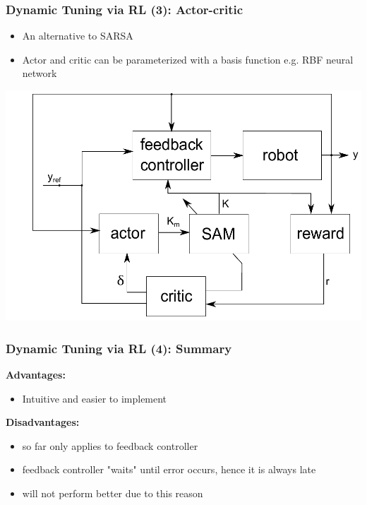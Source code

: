 \documentclass{beamer}
\begin{document}
			\begin{frame}\frametitle{Dynamic Tuning via RL (3): Actor-critic}
				\vspace{3mm}
				\fontsize{8}{4}\selectfont 
				\begin{itemize}
					\item An alternative to SARSA
					\item Actor and critic can be parameterized with a basis function e.g. RBF neural network
				\end{itemize}
				\begin{center}
					\includegraphics[width=0.70\linewidth]{images/actorcritic_dynamictuning}
				\end{center}
			\end{frame}			
			
			\begin{frame}\frametitle{Dynamic Tuning via RL (4): Summary}				
				\vspace{3mm}
				\textbf{Advantages:}
				\begin{itemize}
					\item Intuitive and easier to implement
				\end{itemize}
				\vspace{3mm}
				\textbf{Disadvantages:}
				\begin{itemize}
					\item so far only applies to feedback controller
					\item feedback controller "waits" until error occurs, hence it is always late
					\item  will not perform better due to this reason					
				\end{itemize}
			\end{frame}	
						
\end{document}
